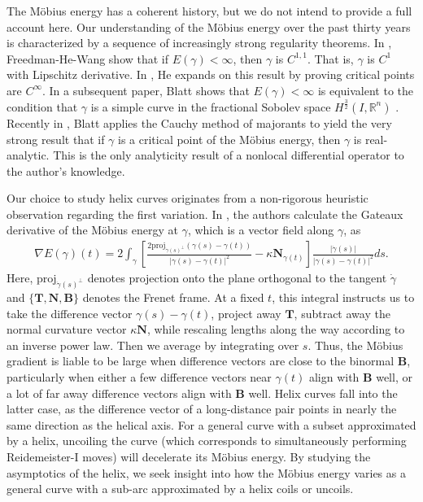 \documentclass{amsart}
\theoremstyle{plain}
\numberwithin{theorem}{section}
\theoremstyle{definition}
\theoremstyle{remark}
\theoremstyle{brakets}
\newcommand{\R}{\mathbb{R}}
\begin{document}
The M\"obius energy has a coherent history, but we do not intend to provide a full account here. Our understanding of the M\"obius energy over the past thirty years is characterized by a sequence of increasingly strong regularity theorems. In \cite{freedman1994mobius}, Freedman-He-Wang show that if $E(\gamma) < \infty$, then $\gamma$ is $C^{1,1}$. That is, $\gamma$ is $C^1$ with Lipschitz derivative. In \cite{he2000}, He expands on this result by proving critical points are $C^\infty$. In a subsequent paper, Blatt shows that $E(\gamma) < \infty$ is equivalent to the condition that $\gamma$ is a simple curve in the fractional Sobolev space $H^{\frac{3}{2}}(I,\R^n)$ \cite{blatt12}. Recently in \cite{blatt20}, Blatt applies the Cauchy method of majorants to yield the very strong result that if $\gamma$ is a critical point of the M\"obius energy, then $\gamma$ is real-analytic. This is the only analyticity result of a nonlocal differential operator to the author's knowledge. 

Our choice to study helix curves originates from a non-rigorous heuristic observation regarding the first variation. In \cite{freedman1994mobius}, the authors calculate the Gateaux derivative of the M\"obius energy at $\gamma$, which is a vector field along $\gamma$, as 
\begin{align}
    \label{mobius-gradient}
    \nabla E(\gamma) (t) = 2 \int_{\gamma} \left[ \frac{2 \text{proj}_{\dot{\gamma}(s)^{\perp}}(\gamma(s) - \gamma(t))}{|\gamma(s)-\gamma(t)|^2} - \kappa \textbf{N}_{\gamma(t)}\right] \frac{|\dot{\gamma}(s)|}{|\gamma(s)-\gamma(t)|^2}ds.
\end{align}
Here, $\text{proj}_{\dot{\gamma}(s)^\perp}$ denotes projection onto the plane orthogonal to the tangent $\dot{\gamma}$ and $\{\textbf{T},\textbf{N},\textbf{B}\}$ denotes the Frenet frame. At a fixed $t$, this integral instructs us to take the difference vector $\gamma(s) - \gamma(t)$, project away $\textbf{T}$, subtract away the normal curvature vector $\kappa\textbf{N}$, while rescaling lengths along the way according to an inverse power law. Then we average by integrating over $s$. Thus, the M\"obius gradient is liable to be large when difference vectors are close to the binormal $\textbf{B}$, particularly when either a few difference vectors near $\gamma(t)$ align with $\textbf{B}$ well, or a lot of far away difference vectors align with $\textbf{B}$ well. Helix curves fall into the latter case, as the difference vector of a long-distance pair points in nearly the same direction as the helical axis. For a general curve with a subset approximated by a helix, uncoiling the curve (which corresponds to simultaneously performing Reidemeister-I moves) will decelerate its M\"obius energy. By studying the asymptotics of the helix, we seek insight into how the M\"obius energy varies as a general curve with a sub-arc approximated by a helix coils or uncoils. 
\end{document}
